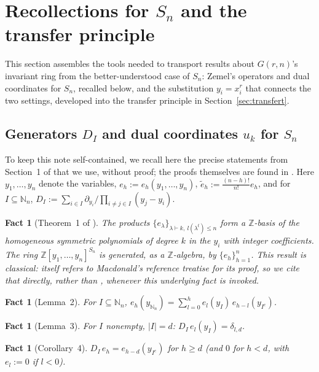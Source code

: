 \documentclass[11pt]{article}
\newtheorem{fact}[theorem]{Fact}
\theoremstyle{remark}
\newcommand{\NN}{\mathbb{N}}
\newcommand{\ZZ}{\mathbb{Z}}
\begin{document}
\section{Recollections for $S_n$ and the transfer principle}

This section assembles the tools needed to transport results about $G(r,n)$'s invariant ring from the better-understood case of $S_n$: Zemel's operators and dual coordinates for $S_n$, recalled below, and the substitution $y_i=x_i^r$ that connects the two settings, developed into the transfer principle in Section~\ref{sec:transfert}.

\subsection{Generators $D_I$ and dual coordinates $u_k$ for $S_n$}\label{sec:rappels}

To keep this note self-contained, we recall here the precise statements from Section~1 of \cite{Ze} that we use, without proof; the proofs themselves are found in \cite{Ze}. Here $y_1,\dots,y_n$ denote the variables, $e_h:=e_h(y_1,\dots,y_n)$, $\tilde e_h:=\frac{(n-h)!}{n!}e_h$, and for $I\subseteq\NN_n$, $D_I:=\sum_{i\in I}\partial_{y_i}/\prod_{i\ne j\in I}(y_j-y_i)$.

\begin{fact}[Theorem~1 of \cite{Ze}]\label{fact:A}
The products $\{e_\lambda\}_{\lambda\vdash k,\ l(\lambda^t)\le n}$ form a $\ZZ$-basis of the homogeneous symmetric polynomials of degree $k$ in the $y_i$ with integer coefficients. The ring $\ZZ[y_1,\dots,y_n]^{S_n}$ is generated, as a $\ZZ$-algebra, by $\{e_h\}_{h=1}^n$. This result is classical: \cite{Ze} itself refers to Macdonald's reference treatise \cite[Ch.~I]{Mac} for its proof, so we cite that directly, rather than \cite{Ze}, whenever this underlying fact is invoked.
\end{fact}

\begin{fact}[Lemma~2]\label{fact:B}
For $I\subseteq\NN_n$, $e_h(y_{\NN_n}) = \sum_{l=0}^h e_l(y_I)\,e_{h-l}(y_{I^c})$.
\end{fact}

\begin{fact}[Lemma~3]\label{fact:C}
For $I$ nonempty, $|I|=d$: $D_I\,e_l(y_I) = \delta_{l,d}$.
\end{fact}

\begin{fact}[Corollary~4]\label{fact:D}
$D_I\,e_h = e_{h-d}(y_{I^c})$ for $h\ge d$ (and $0$ for $h<d$, with $e_l:=0$ if $l<0$).
\end{fact}
\end{document}
